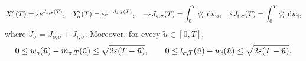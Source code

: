 \begin{lemma}
\begin{enumerate}
  \begin{equation}\label{eq:turn-derivs}
    X_\sigma'(T) = \varepsilon e^{J_{o,\sigma}(T)}, \quad Y_\sigma'(T) = \varepsilon e^{-J_{i,\sigma}(T)}, \quad
    -\varepsilon J_{o,\sigma}(T) = \int_0^T \phi_\sigma'\,\mathrm{d} w_o, \quad \varepsilon J_{i,\sigma}(T) = \int_0^T
    \phi_\sigma'\,\mathrm{d} w_i,
  \end{equation}
  where $J_\sigma = J_{o,\sigma}+J_{i,\sigma}$. Moreover, for every $\tilde{u}\in[0,T]$,
  \begin{equation}\label{eq:envelope-bounds}
    0 \le w_o(\tilde{u}) - m_{\sigma,T}(\tilde{u}) \le \sqrt{2\varepsilon(T-\tilde{u})}, \qquad 0 \le
    l_{\sigma,T}(\tilde{u}) - w_i(\tilde{u}) \le \sqrt{2\varepsilon(T-\tilde{u})}.
  \end{equation}
\end{enumerate}
\end{lemma}


